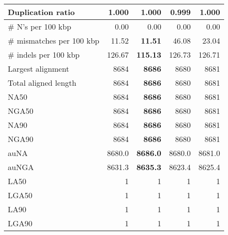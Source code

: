 \documentclass[12pt,a4paper]{article}
\begin{document}
\begin{table}[ht]
\begin{center}
\begin{tabular}{|l*{4}{|r}|}
Duplication ratio & 1.000 & 1.000 & {\bf 0.999} & 1.000 \\ \hline
\# N's per 100 kbp & 0.00 & 0.00 & 0.00 & 0.00 \\ \hline
\# mismatches per 100 kbp & 11.52 & {\bf 11.51} & 46.08 & 23.04 \\ \hline
\# indels per 100 kbp & 126.67 & {\bf 115.13} & 126.73 & 126.71 \\ \hline
Largest alignment & 8684 & {\bf 8686} & 8680 & 8681 \\ \hline
Total aligned length & 8684 & {\bf 8686} & 8680 & 8681 \\ \hline
NA50 & 8684 & {\bf 8686} & 8680 & 8681 \\ \hline
NGA50 & 8684 & {\bf 8686} & 8680 & 8681 \\ \hline
NA90 & 8684 & {\bf 8686} & 8680 & 8681 \\ \hline
NGA90 & 8684 & {\bf 8686} & 8680 & 8681 \\ \hline
auNA & 8680.0 & {\bf 8686.0} & 8680.0 & 8681.0 \\ \hline
auNGA & 8631.3 & {\bf 8635.3} & 8623.4 & 8625.4 \\ \hline
LA50 & 1 & 1 & 1 & 1 \\ \hline
LGA50 & 1 & 1 & 1 & 1 \\ \hline
LA90 & 1 & 1 & 1 & 1 \\ \hline
LGA90 & 1 & 1 & 1 & 1 \\ \hline
\end{tabular}
\end{center}
\end{table}
\end{document}
